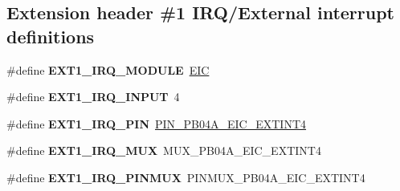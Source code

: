 \subsection*{Extension header \#1 I\+R\+Q/\+External interrupt definitions}
\begin{DoxyCompactItemize}
\item 
\hypertarget{group__saml21__xplained__pro__features__group_ga4b464579ccb12a975a0d23df1c52fed8}{}\#define {\bfseries E\+X\+T1\+\_\+\+I\+R\+Q\+\_\+\+M\+O\+D\+U\+L\+E}~\hyperlink{group___s_a_m_l21_j18_a__base_ga27183a94584b5fca7e1207ce7a79782a}{E\+I\+C}\label{group__saml21__xplained__pro__features__group_ga4b464579ccb12a975a0d23df1c52fed8}

\item 
\hypertarget{group__saml21__xplained__pro__features__group_gae7ca49f8ea06da930916046cbcde0529}{}\#define {\bfseries E\+X\+T1\+\_\+\+I\+R\+Q\+\_\+\+I\+N\+P\+U\+T}~4\label{group__saml21__xplained__pro__features__group_gae7ca49f8ea06da930916046cbcde0529}

\item 
\hypertarget{group__saml21__xplained__pro__features__group_gadfb4a45b28f4fe0ccb122a7b123a3d9f}{}\#define {\bfseries E\+X\+T1\+\_\+\+I\+R\+Q\+\_\+\+P\+I\+N}~\hyperlink{pio_2saml21j18a_8h_a2fc2cfd9a8382477493f71f73bfb7455}{P\+I\+N\+\_\+\+P\+B04\+A\+\_\+\+E\+I\+C\+\_\+\+E\+X\+T\+I\+N\+T4}\label{group__saml21__xplained__pro__features__group_gadfb4a45b28f4fe0ccb122a7b123a3d9f}

\item 
\hypertarget{group__saml21__xplained__pro__features__group_gae71aefb06dd7834030456139f3e19d9a}{}\#define {\bfseries E\+X\+T1\+\_\+\+I\+R\+Q\+\_\+\+M\+U\+X}~M\+U\+X\+\_\+\+P\+B04\+A\+\_\+\+E\+I\+C\+\_\+\+E\+X\+T\+I\+N\+T4\label{group__saml21__xplained__pro__features__group_gae71aefb06dd7834030456139f3e19d9a}

\item 
\hypertarget{group__saml21__xplained__pro__features__group_ga556d8241bd3ae14ae5397437a8e9c9d3}{}\#define {\bfseries E\+X\+T1\+\_\+\+I\+R\+Q\+\_\+\+P\+I\+N\+M\+U\+X}~P\+I\+N\+M\+U\+X\+\_\+\+P\+B04\+A\+\_\+\+E\+I\+C\+\_\+\+E\+X\+T\+I\+N\+T4\label{group__saml21__xplained__pro__features__group_ga556d8241bd3ae14ae5397437a8e9c9d3}

\end{DoxyCompactItemize}

